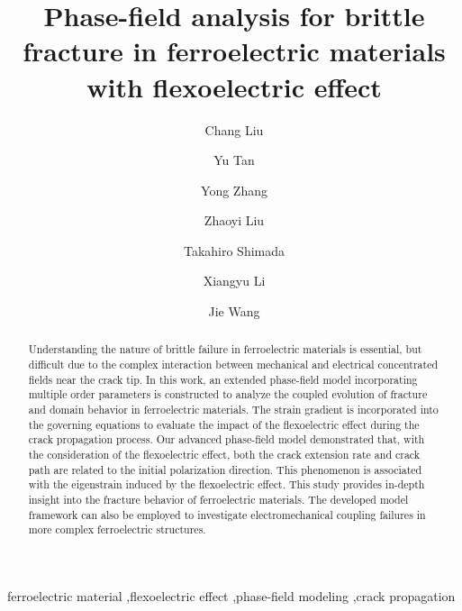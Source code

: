 \documentclass[final,times,fleqn,11pt]{elsarticle}
\begin{document}
\begin{frontmatter}

\title{Phase-field analysis for brittle fracture in ferroelectric materials with flexoelectric effect}

\author[inst1]{Chang Liu}
\author[inst2]{Yu Tan}
\author[inst3]{Yong Zhang}
\author[inst1]{Zhaoyi Liu}
\author[inst4]{Takahiro Shimada}
\author[inst1]{Xiangyu Li}
\author[inst5]{Jie Wang}



\begin{abstract}
Understanding the nature of brittle failure in ferroelectric materials is essential, but difficult due to the complex interaction between mechanical and electrical concentrated fields near the crack tip. In this work, an extended phase-field model incorporating multiple order parameters is constructed to analyze the coupled evolution of fracture and domain behavior in ferroelectric materials. The strain gradient is incorporated into the governing equations to evaluate the impact of the flexoelectric effect during the crack propagation process. Our advanced phase-field model demonstrated that, with the consideration of the flexoelectric effect, both the crack extension rate and crack path are related to the initial polarization direction. This phenomenon is  associated with the eigenstrain induced by the flexoelectric effect. This study provides in-depth insight into the fracture behavior of ferroelectric materials. The developed model framework can also be employed to investigate electromechanical coupling failures in more complex ferroelectric structures.
\end{abstract}

\begin{keyword}
ferroelectric material \sep flexoelectric effect \sep phase-field modeling \sep crack propagation 

\end{keyword}

\end{frontmatter}
\end{document}
